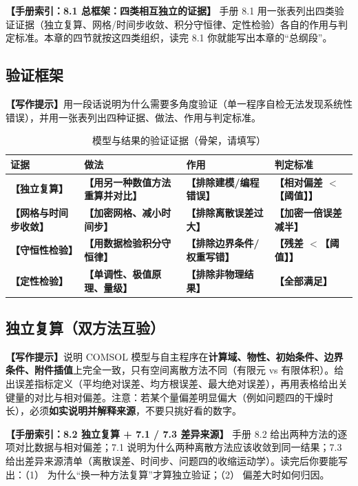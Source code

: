 \documentclass[12pt,a4paper]{article}
\newcommand{\prompt}[1]{\par\noindent\textbf{【写作提示】}#1\par}      %
\newcommand{\ph}[1]{\textbf{【#1】}}                                   %
\newcommand{\handbook}[2]{\par\noindent\textbf{【手册索引：#1】} #2\par}
\begin{document}
\handbook{8.1 总框架：四类相互独立的证据}{手册 8.1 用一张表列出四类验证证据（独立复算、网格/时间步收敛、积分守恒律、定性检验）各自的作用与判定标准。本章的四节就按这四类组织，读完 8.1 你就能写出本章的“总纲段”。}

\subsection{验证框架}

\prompt{用一段话说明为什么需要多角度验证（单一程序自检无法发现系统性错误），并用一张表列出四种证据、做法、作用与判定标准。}

\begin{table}[H]
\centering
\caption{模型与结果的验证证据（骨架，请填写）}
\label{tab:verify-frame}
\begin{tabular}{p{2.6cm}p{5.0cm}p{3.0cm}p{3.8cm}}
\toprule
证据 & 做法 & 作用 & 判定标准\\
\midrule
\ph{独立复算} & \ph{用另一种数值方法重算并对比} & \ph{排除建模/编程错误} & \ph{相对偏差 $<$\ph{阈值}}\\
\ph{网格与时间步收敛} & \ph{加密网格、减小时间步} & \ph{排除离散误差过大} & \ph{加密一倍误差减半}\\
\ph{守恒性检验} & \ph{用数据检验积分守恒律} & \ph{排除边界条件/权重写错} & \ph{残差 $<$\ph{阈值}}\\
\ph{定性检验} & \ph{单调性、极值原理、量级} & \ph{排除非物理结果} & \ph{全部满足}\\
\bottomrule
\end{tabular}
\end{table}

\subsection{独立复算（双方法互验）}

\prompt{说明 COMSOL 模型与自主程序在\textbf{计算域、物性、初始条件、边界条件、附件插值}上完全一致，只有空间离散方法不同（有限元 vs 有限体积）。给出误差指标定义（平均绝对误差、均方根误差、最大绝对误差），再用表格给出关键量的对比与相对偏差。注意：若某个量偏差明显偏大（例如问题四的干燥时长），必须\textbf{如实说明并解释来源}，不要只挑好看的数字。}

\handbook{8.2 独立复算 + 7.1 / 7.3 差异来源}{手册 8.2 给出两种方法的逐项对比数据与相对偏差；7.1 说明为什么两种离散方法应该收敛到同一结果；7.3 给出差异来源清单（离散误差、时间步、问题四的收缩运动学）。读完后你要能写出：（1） 为什么“换一种方法复算”才算独立验证；（2） 偏差大时如何归因。}
\end{document}
